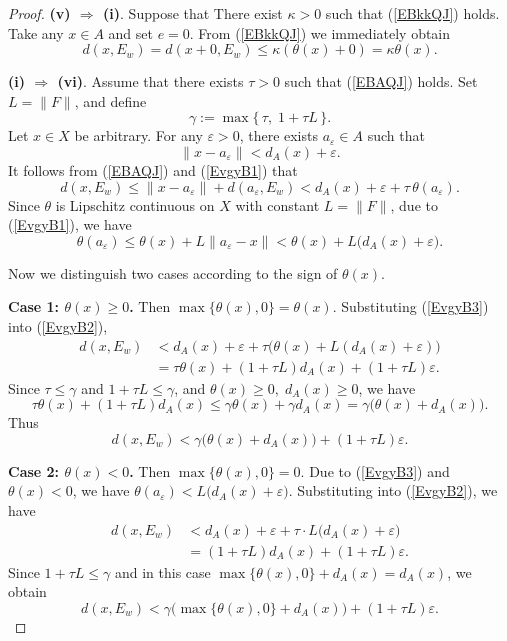 \documentclass[10pt,a4paper]{amsart}
\begin{document}
\begin{proof}
	\noindent\textbf{(v) $\Rightarrow$ (i)}.
Suppose  that There exist \(\kappa > 0\) such that  (\ref{EBkkQJ}) holds.   
Take any \(x \in A\) and set \(e = 0\). From (\ref{EBkkQJ}) we immediately obtain
\[
d(x, E_w) = d(x+0, E_w) \le \kappa (\theta(x) + 0) = \kappa \theta(x).
\]
 
 
	\noindent\textbf{(i) $\Rightarrow$ (vi)}.
Assume  that   there exists $\tau>0$ such that  (\ref{EBAQJ}) holds.
Set $L=\|F\|$, and define
\[
\gamma := \max\{\,\tau,\;1+\tau L\,\}.
\]
Let  $x\in X$      be arbitrary.   For   any    $\varepsilon>0$,  there exists $a_\varepsilon\in A$ such that
 \begin{equation}\label{EvgyB1}	\|x-a_\varepsilon\| < d_A(x)+\varepsilon  .        
 \end{equation}
 It follows from    (\ref{EBAQJ})   and  (\ref{EvgyB1})    that   
 \begin{equation}\label{EvgyB2}
 	d(x,E_w) \le \|x-a_\varepsilon\| + d(a_\varepsilon,E_w) < d_A(x)+\varepsilon + \tau\,\theta(a_\varepsilon) .
 \end{equation}
Since  \(\theta\) is Lipschitz continuous on \(X\) with constant \(L = \|F\|\),  due to (\ref{EvgyB1}),  we have
\begin{equation} \label{EvgyB3}
	\theta(a_\varepsilon) \le \theta(x) + L\|a_\varepsilon-x\| 
	< \theta(x) + L\bigl(d_A(x)+\varepsilon\bigr).  
\end{equation}

Now we distinguish two cases according to the sign of $\theta(x)$.

\noindent\textbf{Case 1: $\theta(x)\ge 0$.}
Then $\max\{\theta(x),0\}=\theta(x)$. Substituting (\ref{EvgyB3}) into (\ref{EvgyB2}),
\[
\begin{aligned}
	d(x,E_w) &< d_A(x)+\varepsilon + \tau\bigl(\theta(x)+L(d_A(x)+\varepsilon)\bigr) \\
	&= \tau\theta(x) + (1+\tau L)d_A(x) + (1+\tau L)\varepsilon.
\end{aligned}
\]
Since $\tau\le\gamma$ and $1+\tau L\le\gamma$, and $\theta(x)\ge0,\;d_A(x)\ge0$, we have
\[
\tau\theta(x) + (1+\tau L)d_A(x) \le \gamma\theta(x) + \gamma d_A(x) = \gamma\bigl(\theta(x)+d_A(x)\bigr).
\]
Thus
\[
d(x,E_w) < \gamma\bigl(\theta(x)+d_A(x)\bigr) + (1+\tau L)\varepsilon.
\]

\noindent\textbf{Case 2: $\theta(x)<0$.}
Then $\max\{\theta(x),0\}=0$. Due to (\ref{EvgyB3})  and   $\theta(x)<0$, we have
$\theta(a_\varepsilon) < L\bigl(d_A(x)+\varepsilon\bigr)$.
Substituting into (\ref{EvgyB2}), we have
\[
\begin{aligned}
	d(x,E_w) &< d_A(x)+\varepsilon + \tau \cdot L\bigl(d_A(x)+\varepsilon\bigr) \\
	&= (1+\tau L)d_A(x) + (1+\tau L)\varepsilon.
\end{aligned}
\]
Since $1+\tau L\le\gamma$ and in this case $\max\{\theta(x),0\}+d_A(x)=d_A(x)$, we obtain
\[
d(x,E_w) < \gamma\bigl(\max\{\theta(x),0\}+d_A(x)\bigr) + (1+\tau L)\varepsilon.
\]


\end{proof}
\end{document}
